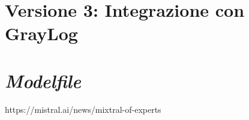 \documentclass[12pt]{report}
\begin{document}


\clearpage

\section{Versione 3: Integrazione con GrayLog}



\clearpage

\section{\textit{Modelfile}}
\label{sec:code_modelfile}




%
%

\beforebibliography


https://mistral.ai/news/mixtral-of-experts


\end{document}
